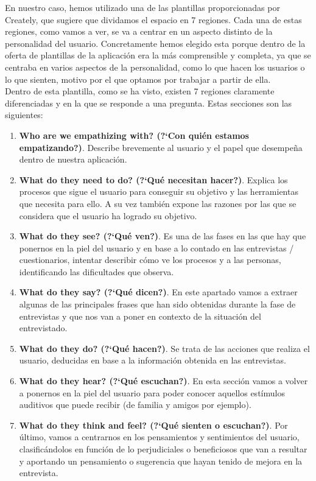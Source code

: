 En nuestro caso, hemos utilizado una de las plantillas proporcionadas por Creately, que sugiere que dividamos el espacio en 7 regiones. Cada una de estas regiones, como vamos a ver, se va a centrar en un aspecto distinto de la personalidad del usuario. Concretamente hemos elegido esta porque dentro de la oferta de plantillas de la aplicación era la más comprensible y completa, ya que se centraba en varios aspectos de la personalidad, como lo que hacen los usuarios o lo que sienten, motivo por el que optamos por trabajar a partir de ella. \\

Dentro de esta plantilla, como se ha visto, existen 7 regiones claramente diferenciadas y en la que se responde a una pregunta. Estas secciones son las siguientes:
\begin{enumerate}
    \item {\textbf{Who are we empathizing with? (?`Con quién estamos empatizando?)}}.  Describe brevemente al usuario y el papel que desempeña dentro de nuestra aplicación.
    \item {\textbf{What do they need to do? (?`Qué necesitan hacer?)}}. Explica los procesos que sigue el usuario para conseguir su objetivo y las herramientas que necesita para ello. A su vez también expone las razones por las que se considera que el usuario ha logrado su objetivo.
    \item {\textbf{What do they see? (?`Qué ven?)}}. Es una de las fases en las que hay que ponernos en la piel del usuario y en base a lo contado en las entrevistas / cuestionarios, intentar describir cómo ve los procesos y a las personas, identificando las dificultades que observa.
    \item {\textbf{What do they say? (?`Qué dicen?)}}. En este apartado vamos a extraer algunas de las principales frases que han sido obtenidas durante la fase de entrevistas y que nos van a poner en contexto de la situación del entrevistado.
    \item {\textbf{What do they do? (?`Qué hacen?)}}. Se trata de las acciones que realiza el usuario, deducidas en base a la información obtenida en las entrevistas.
    \item {\textbf{What do they hear? (?`Qué escuchan?)}}. En esta sección vamos a volver a ponernos en la piel del usuario para poder conocer aquellos estímulos auditivos que puede recibir (de familia y amigos por ejemplo).
    \item {\textbf{What do they think and feel? (?`Qué sienten o escuchan?)}}. Por último, vamos a centrarnos en los pensamientos y sentimientos del usuario, clasificándolos en función de lo perjudiciales o beneficiosos que van a resultar y aportando un pensamiento o sugerencia que hayan tenido de mejora en la entrevista.
\end{enumerate}

